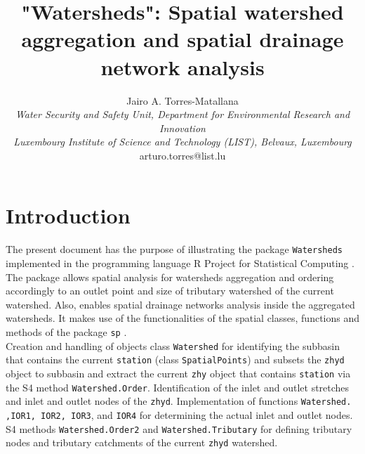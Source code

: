 \documentclass{article}
\begin{document}


\title{\bf "Watersheds": Spatial watershed aggregation and spatial drainage network analysis}
\author{Jairo A. Torres-Matallana\\
{\small \it Water Security and Safety Unit, Department for Environmental Research and
    Innovation}\\
{\small \it Luxembourg Institute of Science and Technology (LIST), Belvaux, Luxembourg}\\
\small arturo.torres@list.lu}
\maketitle


\section{Introduction}

The present document has the purpose of illustrating the package {\tt Watersheds} implemented in the programming language {\sf R} Project for Statistical Computing \cite{Ihaka&Gentleman(1996), RDCoreTeam(2013)}.\\

The package allows spatial analysis for watersheds aggregation and ordering accordingly to an outlet point and size of tributary watershed of the current watershed. Also, enables spatial drainage networks analysis inside the aggregated watersheds. It makes use of the functionalities of the spatial classes, functions and methods of the package {\tt sp} \cite{Pebesma&Bivand(2012)}.\\

Creation and handling of objects class {\tt Watershed} for identifying the subbasin that contains the current {\tt station} (class {\tt SpatialPoints}) and subsets the {\tt zhyd} object to subbasin and extract the current {\tt zhy} object that contains {\tt station} via the S4 method {\tt Watershed.Order}. Identification of the inlet and outlet stretches and inlet and outlet nodes of the {\tt zhyd}. Implementation of functions {\tt Watershed. ,IOR1, IOR2, IOR3}, and {\tt IOR4} for determining the actual inlet and outlet nodes.  S4 methods {\tt Watershed.Order2} and {\tt Watershed.Tributary} for defining tributary nodes and tributary catchments of the current {\tt zhyd} watershed.
\end{document}
